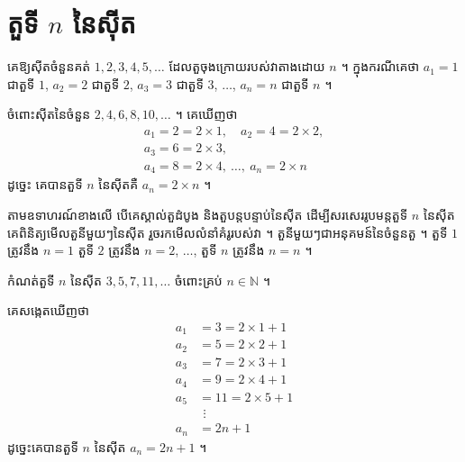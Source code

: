 \section{តួទី \texorpdfstring{$n$}{n} នៃស៊ីត}

\begin{example}[ឧទាហរណ៍ ១]
គេឱ្យស៊ីតចំនួនគត់ $1, 2, 3, 4, 5, \ldots$ ដែលតួចុងក្រោយរបស់វាតាងដោយ $n$ ។ ក្នុងករណីគេថា $a_1 = 1$ ជាតួទី $1$, $a_2 = 2$ ជាតួទី $2$, $a_3 = 3$ ជាតួទី $3$, $\ldots$, $a_n = n$ ជាតួទី $n$ ។
\end{example}

\begin{example}[ឧទាហរណ៍ ២]
ចំពោះស៊ីតនៃចំនួន $2, 4, 6, 8, 10, \ldots$ ។ គេឃើញថា
\[
\begin{gathered}
a_1 = 2 = 2 \times 1, \quad a_2 = 4 = 2 \times 2,\\
a_3 = 6 = 2 \times 3,\\ a_4 = 8 = 2 \times 4,\ \ldots,\ a_n = 2 \times n
\end{gathered}
\]
ដូច្នេះ គេបានតួទី $n$ នៃស៊ីតគឺ $a_n = 2 \times n$ ។
\end{example}

តាមឧទាហរណ៍ខាងលើ បើគេស្គាល់តួដំបូង និងតួបន្តបន្ទាប់នៃស៊ីត ដើម្បីសរសេររូបមន្តតួទី $n$ នៃស៊ីតគេពិនិត្យមើលតួនីមួយៗនៃស៊ីត រួចរកមើលលំនាំគំរូរបស់វា ។ តួនីមួយៗជាអនុគមន៍នៃចំនួនតួ ។ តួទី $1$ ត្រូវនឹង $n = 1$ តួទី $2$ ត្រូវនឹង $n = 2$, $\ldots$, តួទី $n$ ត្រូវនឹង $n = n$ ។

\begin{example}[លំហាត់គំរូ ១]
កំណត់តួទី $n$ នៃស៊ីត $3, 5, 7, 11, \ldots$ ចំពោះគ្រប់ $n \in \mathbb{N}$ ។
\end{example}
\ans
គេសង្កេតឃើញថា
\[
\begin{aligned}
a_1 &= 3 = 2 \times 1 + 1\\
a_2 &= 5 = 2 \times 2 + 1\\
a_3 &= 7 = 2 \times 3 + 1\\
a_4 &= 9 = 2 \times 4 + 1\\
a_5 &= 11 = 2 \times 5 + 1\\
&\ \,\vdots\\
a_n &= 2n + 1
\end{aligned}
\]
ដូច្នេះគេបានតួទី $n$ នៃស៊ីត $a_n = 2n + 1$ ។

